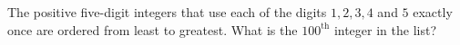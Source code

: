 The positive five-digit integers that use each of the digits $1,2,3,4$ and $5$ exactly once are ordered from least to greatest. What is the $100^{\text{th}}$ integer in the list?
